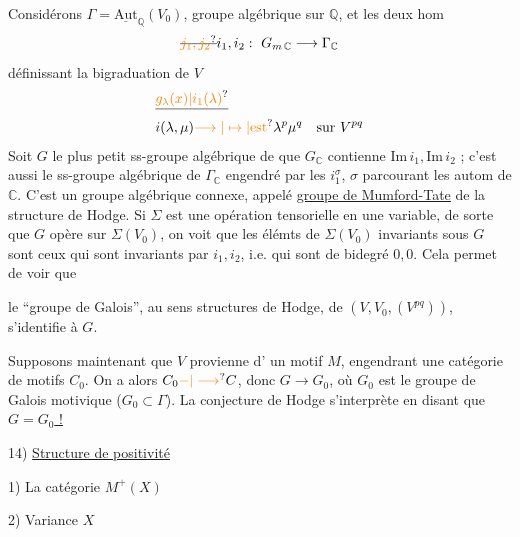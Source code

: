 Considérons $\Gamma=\underline{\mathrm{Aut}}_{\mathbb Q}(V_0)$, groupe algébrique %
sur $\mathbb Q$, et les deux hom %
\[
\deleted{\unsure{j_1,j_2}}i_1,i_2:\ G_{m\,\mathbb C}\longrightarrow\Gamma_{\mathbb C} %
\]
définissant la bigraduation de $V$ %
\[
\begin{aligned}&\deleted{\unsure{g_{\lambda}(x)|i_1(\lambda)}}\\[-2pt]&i(\lambda,\mu)\unsure{\longrightarrow|\mapsto|\text{est}}\lambda^p\mu^q\quad\text{sur }V^{pq}\end{aligned} %
\]
Soit $G$ le plus petit ss-groupe algébrique de \inserted{$\Gamma$} %
 que $G_{\mathbb C}$ contienne $\mathrm{Im}\,i_1,\mathrm{Im}\,i_2$ ; %
 c'est aussi le ss-groupe algébrique de %
 $\Gamma_{\mathbb C}$  engendré par les $i_1^\sigma$, $\sigma$ parcourant %
les  autom de $\mathbb C$. C'est un groupe %
algébrique connexe, appelé \uline{groupe de Mumford-Tate} %
de la structure de Hodge.  Si $\Sigma$ est %
une opération tensorielle en une variable, %
de sorte que $G$ opère sur $\Sigma(V_0)$, %
on voit que les élémts de $\Sigma(V_0)$ invariants %
sous $G$ sont  ceux qui sont %
invariants par  $i_1,i_2$, i.e. qui sont de %
bidegré $0,0$. Cela permet de voir que %

le ``groupe de Galois'', au sens structures de %
Hodge, de $(V,V_0,(V^{pq}))$, s'identifie à $G$. %

Supposons maintenant que $V$ provienne d'%
un motif $M$, engendrant une \inserted{$\otimes$-}catégorie de %
motifs $C_0$. On a alors $C_0\unsure{-|\longrightarrow}C$, donc %
$G\longrightarrow G_0$, où $G_0$ est le groupe de Galois %
motivique ($G_0\subset\Gamma$). La conjecture de %
Hodge s'interprète en disant que \uline{$G=G_0$ !} %

14) \uline{Structure de positivité} %

\hfill{} %

1) La catégorie $M^+(X)$ %

2) Variance  $X$ %

